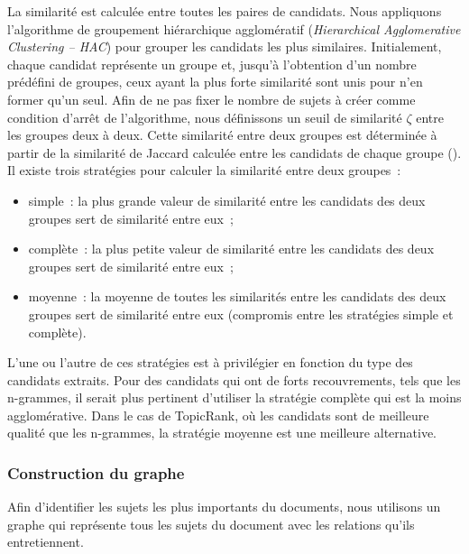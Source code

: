         La similarité est calculée entre toutes les paires de candidats. Nous
        appliquons l'algorithme de groupement hiérarchique agglomératif
        (\textit{Hierarchical Agglomerative Clustering -- \textsc{HAC}}) pour
        grouper les candidats les plus similaires. Initialement, chaque candidat
        représente un groupe et, jusqu'à l'obtention d'un nombre prédéfini de
        groupes, ceux ayant la plus forte similarité sont unis pour n'en former
        qu'un seul. Afin de ne pas fixer le nombre de sujets à créer comme
        condition d'arrêt de l'algorithme, nous définissons un seuil de
        similarité $\zeta$ entre les groupes deux à deux. Cette similarité entre
        deux groupes est déterminée à partir de la similarité de Jaccard
        calculée entre les candidats de chaque groupe (). Il
        existe trois stratégies pour calculer la similarité entre deux groupes~:
        \begin{itemize}
          \item{simple~: la plus grande valeur de similarité entre les candidats
                des deux groupes sert de similarité entre eux~;}
          \item{complète~: la plus petite valeur de similarité entre les
                candidats des deux groupes sert de similarité entre eux~;}
          \item{moyenne~: la moyenne de toutes les similarités entre les
                candidats des deux groupes sert de similarité entre eux
                (compromis entre les stratégies simple et complète).}
        \end{itemize}
        L'une ou l'autre de ces stratégies est à privilégier en fonction du type
        des candidats extraits. Pour des candidats qui ont de forts
        recouvrements, tels que les n-grammes, il serait plus pertinent
        d'utiliser la stratégie complète qui est la moins agglomérative. Dans le
        cas de TopicRank, où les candidats sont de meilleure qualité que les
        n-grammes, la stratégie moyenne est une meilleure alternative.


      \subsubsection{Construction du graphe}
      \label{subsubsec:main-automatic_keyphrase_annotation-unsupervised_automatic_keyphrase_extraction-topicrank-graph_construction}
        Afin d'identifier les sujets les plus importants du documents, nous
        utilisons un graphe qui représente tous les sujets du document avec les
        relations qu'ils entretiennent.

